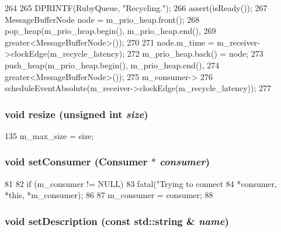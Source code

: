 \begin{DoxyCode}
264 {
265     DPRINTF(RubyQueue, "Recycling.\n");
266     assert(isReady());
267     MessageBufferNode node = m_prio_heap.front();
268     pop_heap(m_prio_heap.begin(), m_prio_heap.end(),
269         greater<MessageBufferNode>());
270 
271     node.m_time = m_receiver->clockEdge(m_recycle_latency);
272     m_prio_heap.back() = node;
273     push_heap(m_prio_heap.begin(), m_prio_heap.end(),
274         greater<MessageBufferNode>());
275     m_consumer->
276         scheduleEventAbsolute(m_receiver->clockEdge(m_recycle_latency));
277 }
\end{DoxyCode}
\hypertarget{classMessageBuffer_a80ad9f22f168208fada0b5d4b332e6a9}{
\subsubsection[{resize}]{\setlength{\rightskip}{0pt plus 5cm}void resize (unsigned int {\em size})}}
\label{classMessageBuffer_a80ad9f22f168208fada0b5d4b332e6a9}



\begin{DoxyCode}
135 { m_max_size = size; }
\end{DoxyCode}
\hypertarget{classMessageBuffer_a81e888318cb316e49e3b6c9989970bb0}{
\subsubsection[{setConsumer}]{\setlength{\rightskip}{0pt plus 5cm}void setConsumer ({\bf Consumer} $\ast$ {\em consumer})}}
\label{classMessageBuffer_a81e888318cb316e49e3b6c9989970bb0}



\begin{DoxyCode}
81     {
82         if (m_consumer != NULL) {
83             fatal("Trying to connect %
84                                      *consumer, *this, *m_consumer);
86         }
87         m_consumer = consumer;
88     }
\end{DoxyCode}
\hypertarget{classMessageBuffer_a9cdbe64eebafb111a124edec55ed2340}{
\subsubsection[{setDescription}]{\setlength{\rightskip}{0pt plus 5cm}void setDescription (const std::string \& {\em name})}}
\label{classMessageBuffer_a9cdbe64eebafb111a124edec55ed2340}




